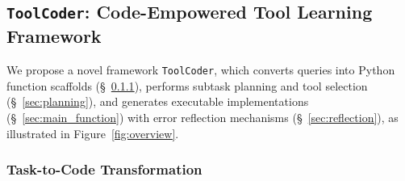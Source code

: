 


\subsection{\texttt{ToolCoder}: Code-Empowered Tool Learning Framework}
We propose a novel framework \texttt{ToolCoder}, which converts queries into Python function scaffolds (\S~\ref{sec:task_to_code}), performs subtask planning and tool selection (\S~\ref{sec:planning}), and generates executable implementations (\S~\ref{sec:main_function}) with error reflection mechanisms (\S~\ref{sec:reflection}), as illustrated in Figure~\ref{fig:overview}.


\subsubsection{Task-to-Code Transformation}
\label{sec:task_to_code}

